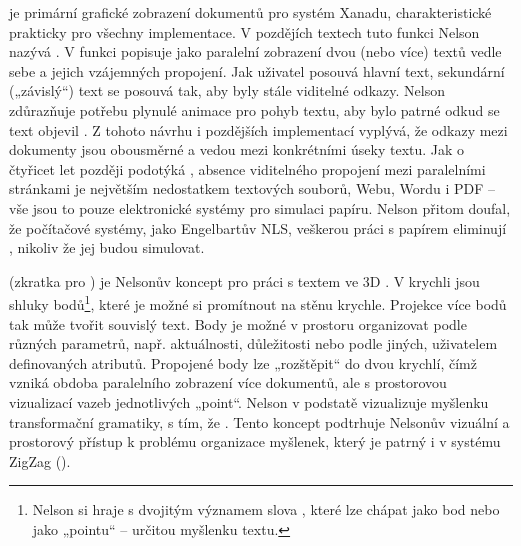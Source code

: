 \label{p:dm:paraviz}
 je primární grafické zobrazení dokumentů pro systém Xanadu, charakteristické prakticky pro všechny implementace. V pozdějích textech tuto funkci Nelson nazývá  \autocite{paraviz}. V  funkci popisuje jako paralelní zobrazení dvou (nebo více) textů vedle sebe a jejich vzájemných propojení. Jak uživatel posouvá hlavní text, sekundární („závislý“) text se posouvá tak, aby byly stále viditelné odkazy. Nelson zdůrazňuje potřebu plynulé animace pro pohyb textu, aby bylo patrné odkud se text objevil \autocite[DM53]{Nelson1974}.
Z tohoto návrhu i pozdějších implementací vyplývá, že odkazy mezi dokumenty jsou obousměrné a vedou mezi konkrétními úseky textu. Jak o čtyřicet let později podotýká \textcite[17.10]{intertw:Nelson}, absence viditelného propojení mezi paralelními stránkami je největším nedostatkem textových souborů, Webu, Wordu i PDF -- vše jsou to pouze elektronické systémy pro simulaci papíru. Nelson přitom doufal, že počítačové systémy, jako Engelbartův NLS, veškerou práci s papírem eliminují \autocite[DM45]{Nelson1974}, nikoliv že jej budou simulovat.

 (zkratka pro ) je Nelsonův koncept pro práci s textem ve 3D \autocite[DM55]{Nelson1974}. V krychli jsou shluky bodů\footnote{Nelson si hraje s dvojitým významem slova , které lze chápat jako bod nebo jako „pointu“ -- určitou myšlenku textu.},
které je možné si promítnout na stěnu krychle. Projekce více bodů tak může tvořit souvislý text.  Body je možné v prostoru organizovat podle různých parametrů, např. aktuálnosti, důležitosti nebo podle jiných, uživatelem definovaných atributů. Propojené body lze „rozštěpit“ do dvou krychlí, čímž vzniká obdoba paralelního zobrazení více dokumentů, ale s prostorovou vizualizací vazeb jednotlivých „point“.
Nelson v podstatě vizualizuje myšlenku transformační gramatiky, s tím, že .
Tento koncept podtrhuje Nelsonův vizuální a prostorový přístup k problému organizace myšlenek, který je patrný i v systému ZigZag ().

